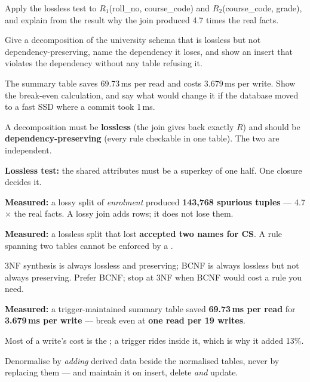 \begin{checkpoint}
\begin{tightnum}
  \item Apply the lossless test to $R_1$(roll\_no, course\_code) and
        $R_2$(course\_code, grade), and explain from the result why the join
        produced 4.7 times the real facts.
  \item Give a decomposition of the university schema that is lossless but not
        dependency-preserving, name the dependency it loses, and show an insert
        that violates the dependency without any table refusing it.
  \item The summary table saves 69.73\,ms per read and costs 3.679\,ms per
        write. Show the break-even calculation, and say what would change it
        if the database moved to a fast SSD where a commit took 1\,ms.
\end{tightnum}
\end{checkpoint}

\begin{chaptersummary}
\begin{tight}
  \item A decomposition must be \textbf{lossless} (the join gives back exactly
        $R$) and should be \textbf{dependency-preserving} (every rule checkable
        in one table). The two are independent.
  \item \textbf{Lossless test:} the shared attributes must be a superkey of one
        half. One closure decides it.
  \item \textbf{Measured:} a lossy split of \textit{enrolment} produced
        \textbf{143{,}768 spurious tuples} --- 4.7$\times$ the real facts. A
        lossy join adds rows; it does not lose them.
  \item \textbf{Measured:} a lossless split that lost
         \textbf{accepted two names for CS}. A rule
        spanning two tables cannot be enforced by a .
  \item 3NF synthesis is always lossless and preserving; BCNF is always
        lossless but not always preserving. Prefer BCNF; stop at 3NF when BCNF
        would cost a rule you need.
  \item \textbf{Measured:} a trigger-maintained summary table saved
        \textbf{69.73\,ms per read} for \textbf{3.679\,ms per write} --- break
        even at \textbf{one read per 19 writes}.
  \item Most of a write's cost is the ; a trigger rides inside
        it, which is why it added 13\%.
  \item Denormalise by \emph{adding} derived data beside the normalised
        tables, never by replacing them --- and maintain it on insert, delete
        \emph{and} update.
\end{tight}
\end{chaptersummary}

